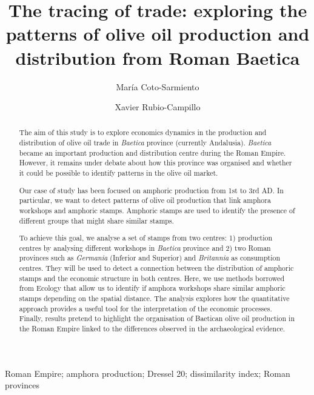 \documentclass[review]{elsarticle}
\begin{document}
\begin{frontmatter}

\title{The tracing of trade: exploring the patterns of olive oil production and distribution from Roman Baetica}

\author[ceipacadress]{María Coto-Sarmiento}


\author[edadress,ubadress]{Xavier Rubio-Campillo}

\address[ceipacadress]{Department of Prehistory and Archaeology, Montalegre, 6-8, 08001, University of Barcelona, Barcelona, Spain}
\address[edadress]{School of History, Classic \& Archaeology, Room OOM.33, William Robertson Wing, Old Medical School, Teviot Place, University of Edinburgh, UK}
\address[ubadress]{DIDPATRI, Passeig de la Vall d'Hebrón, 171, Barcelona, Spain}

\begin{keyword}
Roman Empire; amphora production; Dressel 20; dissimilarity index; Roman provinces
\end{keyword}


\begin{abstract}

The aim of this study is to explore economics dynamics in the production and distribution of olive oil trade in \textit{Baetica} province (currently Andalusia). \textit{Baetica} became an important production and distribution centre during the Roman Empire. However, it remains under debate about how this province was organised and whether it could be possible to identify patterns in the olive oil market. 

Our case of study has been focused on amphoric production from 1st to 3rd AD. In particular, we want to detect patterns of olive oil production that link amphora workshops and amphoric stamps. Amphoric stamps are used to identify the presence of different groups that might share similar stamps. 

To achieve this goal, we analyse a set of stamps from two centres: 1) production centres by analysing different workshops in \textit{Baetica} province and 2) two Roman provinces such as \textit{Germania} (Inferior and Superior) and \textit{Britannia} as consumption centres. They will be used to detect a connection between the distribution of amphoric stamps and the economic structure in both centres. Here, we use methods borrowed from Ecology that allow us to identify if amphora workshops share similar amphoric stamps depending on the spatial distance. The analysis explores how the quantitative approach provides a useful tool for the interpretation of the economic processes. Finally, results pretend to highlight the organisation of Baetican olive oil production in the Roman Empire linked to the differences observed in the archaeological evidence.



\end{abstract}
\end{frontmatter}
\end{document}
